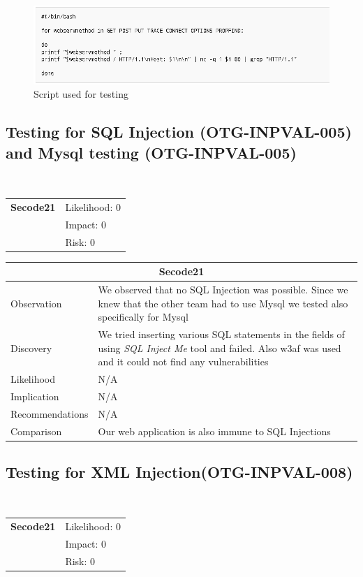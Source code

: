 \documentclass[headsepline,footsepline,footinclude=false,oneside,fontsize=11pt,paper=a4,listof=totoc,bibliography=totoc]{scrbook} %
\begin{document}
\begin{figure}
	\includegraphics[width=\linewidth]{script.png}
	\caption{Script used for testing}
	\label{fig:script}
\end{figure}

\pagebreak
\subsection{Testing for SQL Injection (OTG-INPVAL-005) and Mysql testing (OTG-INPVAL-005)}\

\begin{tabular}{cR{12cm}}
	\textbf{Secode21} & Likelihood: 0\\& Impact: 0\\& Risk: 0
\end{tabular}

\begin{tabular}{ l|p{11cm}  }
	\hline
	\multicolumn{2}{c}{\textbf{Secode21}} \\
	\hline
	Observation   & We observed that no SQL Injection was possible. Since we knew that the other team had
	to use Mysql we tested also specifically for Mysql \\
	Discovery  & We tried inserting various SQL statements in the fields of using \textit{SQL Inject Me} tool and failed.
	Also w3af was used and it could not find any vulnerabilities \\
	Likelihood & N/A \\
	Implication    & N/A \\
	Recommendations & N/A \\
	Comparison& Our web application is also immune to SQL Injections \\
	\hline
\end{tabular}

\pagebreak
\subsection{Testing for XML Injection(OTG-INPVAL-008)}\

\begin{tabular}{cR{12cm}}
	\textbf{Secode21} & Likelihood: 0\\& Impact: 0\\& Risk: 0
\end{tabular}
\end{document}
